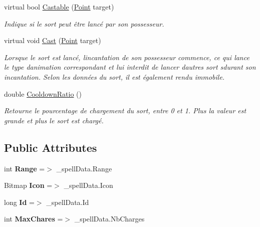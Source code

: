 \begin{DoxyCompactItemize}
virtual bool \hyperlink{class_tentacle_slicers_1_1spells_1_1_spell_ae1c14da219bcc85510459df0bbb8daa0}{Castable} (\hyperlink{class_tentacle_slicers_1_1general_1_1_point}{Point} target)
\begin{DoxyCompactList}\small\item\em Indique si le sort peut être lancé par son possesseur. \end{DoxyCompactList}\item 
virtual void \hyperlink{class_tentacle_slicers_1_1spells_1_1_spell_ac7f1bf84219ade09c2bbe6749eeb6496}{Cast} (\hyperlink{class_tentacle_slicers_1_1general_1_1_point}{Point} target)
\begin{DoxyCompactList}\small\item\em Lorsque le sort est lancé, l\textquotesingle{}incantation de son possesseur commence, ce qui lance le type d\textquotesingle{}animation correspondant et lui interdit de lancer d\textquotesingle{}autres sort sdurant son incantation. Selon les données du sort, il est également rendu immobile. \end{DoxyCompactList}\item 
double \hyperlink{class_tentacle_slicers_1_1spells_1_1_spell_a85ff8039a270ba8dea0024beb6030ca8}{Cooldown\+Ratio} ()
\begin{DoxyCompactList}\small\item\em Retourne le pourcentage de chargement du sort, entre 0 et 1. Plus la valeur est grande et plus le sort est chargé. \end{DoxyCompactList}\end{DoxyCompactItemize}
\subsection*{Public Attributes}
\begin{DoxyCompactItemize}
\item 
\mbox{\label{class_tentacle_slicers_1_1spells_1_1_spell_ad1e8e5d54cd8180d0c610ad9f8cfc48b}} 
int {\bfseries Range} =$>$ \+\_\+spell\+Data.\+Range
\item 
\mbox{\label{class_tentacle_slicers_1_1spells_1_1_spell_a5fc7eb8f88534f04a7289dd83d4101d4}} 
Bitmap {\bfseries Icon} =$>$ \+\_\+spell\+Data.\+Icon
\item 
\mbox{\label{class_tentacle_slicers_1_1spells_1_1_spell_af6b75e73ab6b7de1eca091bee60ec42f}} 
long {\bfseries Id} =$>$ \+\_\+spell\+Data.\+Id
\item 
\mbox{\label{class_tentacle_slicers_1_1spells_1_1_spell_a691ae41caee56f29fb6275be1923a786}} 
int {\bfseries Max\+Chares} =$>$ \+\_\+spell\+Data.\+Nb\+Charges
\end{DoxyCompactItemize}
